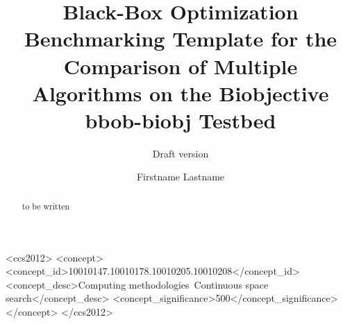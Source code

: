 \documentclass[sigconf]{acmart}
\newcommand{\bbobbiobj}{{\ttfamily bbob-biobj}\xspace}
\begin{document}
\title{Black-Box Optimization Benchmarking Template for the Comparison of Multiple Algorithms on the Biobjective \bbobbiobj Testbed}
\renewcommand{\shorttitle}{Template to Compare Multiple Algorithms on the \bbobbiobj Testbed}
\subtitle{Draft version}



\author{Firstname Lastname}
%
%
%
%
%
%
%

\renewcommand{\shortauthors}{Firstname Lastname et. al.}


\begin{abstract}
to be written
\end{abstract}


%
%
 \begin{CCSXML}
<ccs2012>
<concept>
<concept_id>10010147.10010178.10010205.10010208</concept_id>
<concept_desc>Computing methodologies~Continuous space search</concept_desc>
<concept_significance>500</concept_significance>
</concept>
</ccs2012>
\end{CCSXML}
\end{document}
